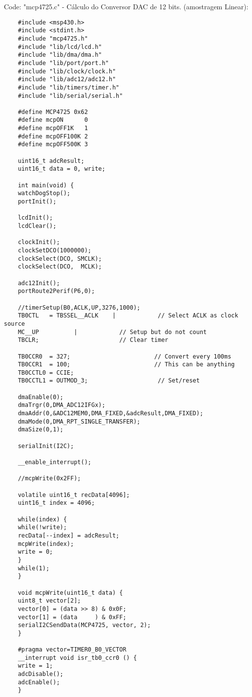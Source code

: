 Code: "mcp4725.c" - Cálculo do Conversor DAC de 12 bits. (amostragem Linear):
\begin{lstlisting}
	#include <msp430.h> 
	#include <stdint.h>
	#include "mcp4725.h"
	#include "lib/lcd/lcd.h"
	#include "lib/dma/dma.h"
	#include "lib/port/port.h"
	#include "lib/clock/clock.h"
	#include "lib/adc12/adc12.h"
	#include "lib/timers/timer.h"
	#include "lib/serial/serial.h"
	
	#define MCP4725 0x62
	#define mcpON      0
	#define mcpOFF1K   1
	#define mcpOFF100K 2
	#define mcpOFF500K 3
	
	uint16_t adcResult;
	uint16_t data = 0, write;
	
	int main(void) {
	watchDogStop();
	portInit();
	
	lcdInit();
	lcdClear();
	
	clockInit();
	clockSetDCO(1000000);
	clockSelect(DCO, SMCLK);
	clockSelect(DCO,  MCLK);
	
	adc12Init();
	portRoute2Perif(P6,0);
	
	//timerSetup(B0,ACLK,UP,3276,1000);
	TB0CTL   = TBSSEL__ACLK    |            // Select ACLK as clock source
	MC__UP          |            // Setup but do not count
	TBCLR;                       // Clear timer
	
	TB0CCR0  = 327;                        // Convert every 100ms
	TB0CCR1  = 100;                        // This can be anything
	TB0CCTL0 = CCIE;
	TB0CCTL1 = OUTMOD_3;                    // Set/reset
	
	dmaEnable(0);
	dmaTrgr(0,DMA_ADC12IFGx);
	dmaAddr(0,&ADC12MEM0,DMA_FIXED,&adcResult,DMA_FIXED);
	dmaMode(0,DMA_RPT_SINGLE_TRANSFER);
	dmaSize(0,1);
	
	serialInit(I2C);
	
	__enable_interrupt();
	
	//mcpWrite(0x2FF);
	
	volatile uint16_t recData[4096];
	uint16_t index = 4096;
	
	while(index) {
	while(!write);
	recData[--index] = adcResult;
	mcpWrite(index);
	write = 0;
	}
	while(1);
	}
	
	void mcpWrite(uint16_t data) {
	uint8_t vector[2];
	vector[0] = (data >> 8) & 0x0F;
	vector[1] = (data     ) & 0xFF;
	serialI2CSendData(MCP4725, vector, 2);
	}
	
	#pragma vector=TIMER0_B0_VECTOR
	__interrupt void isr_tb0_ccr0 () {
	write = 1;
	adcDisable();
	adcEnable();
	}
	
\end{lstlisting}

